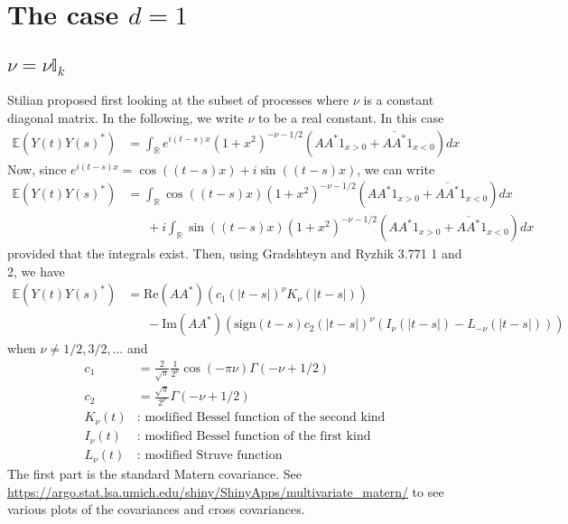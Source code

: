 \documentclass[11pt]{article}
\begin{document}
\section{The case $d=1$}


\subsection{$\nu = \nu \mathbb{I}_k$}

Stilian proposed first looking at the subset of processes where $\nu$ is a constant diagonal matrix. In the following, we write $\nu$ to be a real constant. In this case \begin{align*}
\mathbb{E}\left(Y(t) Y(s)^*\right)&=\int_\mathbb{R} e^{i(t-s)x}(1 + x^2)^{-\nu - 1/2}(AA^*1_{x> 0} + \overline{AA^*}1_{x < 0}) dx
\end{align*}
Now, since $e^{i(t-s)x} = \cos((t -s) x) + i \sin( (t-s) x)$, we can write \begin{align*}
\mathbb{E}\left(Y(t) Y(s)^*\right) &= \int_\mathbb{R} \cos((t -s)  x) (1 + x^2)^{-\nu - 1/2}(AA^*1_{x> 0} + \overline{AA^*}1_{x < 0}) dx \\
& \ \ \ \ \ \ \ +i\int_\mathbb{R} \sin((t -s) x) (1 + x^2)^{-\nu - 1/2}(AA^*1_{x> 0} + \overline{AA^*}1_{x < 0}) dx
\end{align*}provided that the integrals exist. Then, using Gradshteyn and Ryzhik 3.771 1 and 2, we have \begin{align*}
\mathbb{E}\left(Y(t) Y(s)^*\right) &= \textrm{Re}(AA^*)\left(c_1\left(|t-s|\right)^{\nu} K_{\nu}(|t-s|) \right)\\
& \ \ \ \ \ \ \ -\textrm{Im}(AA^*)\left(\textrm{sign}(t-s)c_2\left(|t-s|\right)^{\nu} \left(I_{\nu}(|t-s|) - L_{-\nu}(|t-s|)\right) \right)
\end{align*}when $\nu \neq 1/2, 3/2, \dots$ and  \begin{align*}
c_1 &= \frac{2}{\sqrt{\pi}} \frac{1}{2^\nu}\cos(-\pi \nu) \Gamma(-\nu + 1/2)\\
c_2 &=  \frac{\sqrt{\pi}}{2^\nu}\Gamma(-\nu + 1/2)\\
K_\nu(t) &: \textrm{ modified Bessel function of the second kind}\\
I_\nu(t) &: \textrm{ modified Bessel function of the first kind}\\
L_\nu(t) &: \textrm{ modified Struve function}
\end{align*}The first part is the standard Matern covariance. See \url{https://argo.stat.lsa.umich.edu/shiny/ShinyApps/multivariate_matern/} to see various plots of the covariances and cross covariances.
\end{document}
